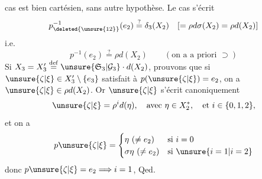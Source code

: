  cas est bien cartésien, sans autre hypothèse. Le cas \unsure{$(**)$} s'écrit
\[
p_{\deleted{\unsure{12}}}^{-1}(e_2)\overset{?}=\delta_3(X_2)\quad[=\rho d\sigma(X_2)=\rho d(X_2)]
\]
 i.e.
\[
p^{-1}(e_2)\overset{?}=\rho d(X_2)\qquad(\text{on a a priori }\supset)
\]
Si $X_3=X'_3\overset{\mathrm{def}}=\unsure{\mathfrak S_3|\mathcal G_3}\cdot d(X_2)$,
 prouvons que  si $\unsure{\zeta|\xi}\in X'_3\setminus\{e_3\}$ satisfait à $p(\unsure{\zeta|\xi})=e_2$, on a $\unsure{\zeta|\xi}\in\rho d(X_2)$. Or $\unsure{\zeta|\xi}$ s'écrit canoniquement
\[
\unsure{\zeta|\xi}=\rho^i d(\eta),\quad\text{avec }\eta\in X_2^*,\quad\text{et }i\in\{0,1,2\},
\]
et on a
\[
p\unsure{\zeta|\xi}=\begin{cases}
\eta\ (\ne e_2)&\text{si }i=0\\
\sigma\eta\ (\ne e_2)&\text{si }\unsure{i=1|i=2}
\end{cases}
\]
donc $p\unsure{\zeta|\xi}=e_2\Longrightarrow i=1$, Qed.


